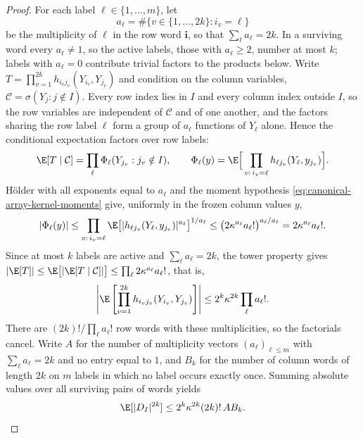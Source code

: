 \begin{proof}
For each label $\ell\in\{1,\ldots,m\}$, let
\begin{equation}
 a_\ell=\#\{v\in\{1,\ldots,2k\}:i_v=\ell\}
 \label{eq:row-multiplicity}
\end{equation}
be the multiplicity of $\ell$ in the row word $\mathbf i$, so that $\sum_\ell a_\ell=2k$.  In a surviving word every $a_\ell\ne1$, so the active labels, those with $a_\ell\ge2$, number at most $k$; labels with $a_\ell=0$ contribute trivial factors to the products below.  Write $T=\prod_{v=1}^{2k}h_{i_vj_v}(Y_{i_v},Y_{j_v})$ and condition on the column variables, $\mathcal C=\sigma(Y_j:j\notin I)$.  Every row index lies in $I$ and every column index outside $I$, so the row variables are independent of $\mathcal C$ and of one another, and the factors sharing the row label $\ell$ form a group of $a_\ell$ functions of $Y_\ell$ alone.  Hence the conditional expectation factors over row labels:
\begin{equation}
 \E[T\mid\mathcal C]
 =\prod_\ell\Phi_\ell(Y_{j_v}:j_v\notin I),
 \qquad
 \Phi_\ell(y)=\E\Big[\prod_{v:\,i_v=\ell}h_{\ell j_v}(Y_\ell,y_{j_v})\Big].
 \label{eq:array-conditional-factor}
\end{equation}
H\"older with all exponents equal to $a_\ell$ and the moment hypothesis \eqref{eq:canonical-array-kernel-moments} give, uniformly in the frozen column values $y$,
\begin{equation}
 |\Phi_\ell(y)|
 \le\prod_{v:\,i_v=\ell}\E\big[|h_{\ell j_v}(Y_\ell,y_{j_v})|^{a_\ell}\big]^{1/a_\ell}
 \le\big(2\kappa^{a_\ell}a_\ell!\big)^{a_\ell/a_\ell}
 =2\kappa^{a_\ell}a_\ell!.
 \label{eq:array-holder-group}
\end{equation}
Since at most $k$ labels are active and $\sum_\ell a_\ell=2k$, the tower property gives $|\E[T]|\le\E\big[|\E[T\mid\mathcal C]|\big]\le\prod_\ell2\kappa^{a_\ell}a_\ell!$, that is,
\begin{equation}
 \left|\E\left[\prod_{v=1}^{2k}
 h_{i_vj_v}(Y_{i_v},Y_{j_v})\right]\right|
 \le 2^k\kappa^{2k}\prod_\ell a_\ell!.
 \label{eq:array-word-moment}
\end{equation}
There are $(2k)!/\prod_\ell a_\ell!$ row words with these multiplicities, so the factorials cancel.  Write $A$ for the number of multiplicity vectors $(a_\ell)_{\ell\le m}$ with $\sum_\ell a_\ell=2k$ and no entry equal to $1$, and $B_k$ for the number of column words of length $2k$ on $m$ labels in which no label occurs exactly once.  Summing absolute values over all surviving pairs of words yields
\begin{equation}
 \E[|D_I|^{2k}]\le2^k\kappa^{2k}(2k)!\,A B_k.
 \label{eq:array-count-reduction}
\end{equation}


\end{proof}

